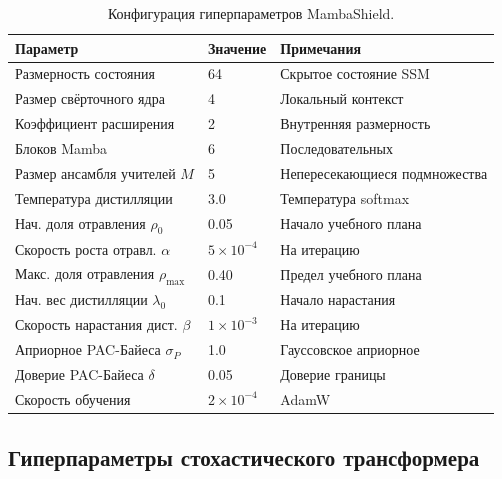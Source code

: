 \begin{table}[htbp]
\centering
\caption{Конфигурация гиперпараметров MambaShield.}
\label{tab:hp_mamba}
\begin{tabular}{lll}
\toprule
Параметр & Значение & Примечания \\
\midrule
Размерность состояния      & 64    & Скрытое состояние SSM \\
Размер свёрточного ядра    & 4     & Локальный контекст \\
Коэффициент расширения     & 2     & Внутренняя размерность \\
Блоков Mamba               & 6     & Последовательных \\
Размер ансамбля учителей $M$ & 5   & Непересекающиеся подмножества \\
Температура дистилляции    & 3.0   & Температура softmax \\
Нач. доля отравления $\rho_0$ & 0.05 & Начало учебного плана \\
Скорость роста отравл. $\alpha$ & $5\times10^{-4}$ & На итерацию \\
Макс. доля отравления $\rho_{\max}$ & 0.40 & Предел учебного плана \\
Нач. вес дистилляции $\lambda_0$ & 0.1 & Начало нарастания \\
Скорость нарастания дист. $\beta$ & $1\times10^{-3}$ & На итерацию \\
Априорное PAC-Байеса $\sigma_P$ & 1.0 & Гауссовское априорное \\
Доверие PAC-Байеса $\delta$ & 0.05 & Доверие границы \\
Скорость обучения          & $2\times10^{-4}$ & AdamW \\
\bottomrule
\end{tabular}
\end{table}


\subsection{Гиперпараметры стохастического трансформера}
\label{app:hp_stochastic}

